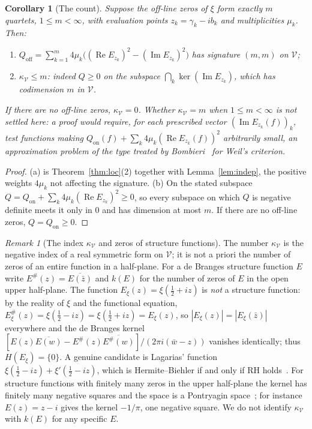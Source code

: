 \documentclass[11pt]{amsart}
\newtheorem{corollary}[theorem]{Corollary}
\theoremstyle{definition}
\theoremstyle{remark}
\newtheorem{remark}[theorem]{Remark}
\newcommand{\RH}{\mathrm{RH}}
\renewcommand{\Re}{\operatorname{Re}}
\renewcommand{\Im}{\operatorname{Im}}
\newcommand{\half}{\tfrac12}
\newcommand{\kV}{\kappa_{\mathcal V}}
\begin{document}
\begin{corollary}[The count]\label{cor:count}
Suppose the off-line zeros of $\xi$ form exactly $m$ quartets, $1\le m<\infty$, with evaluation
points $z_k=\gamma_k-ib_k$ and multiplicities $\mu_k$. Then:
\begin{enumerate}
\item[(a)] $Q_{\mathrm{off}}=\sum_{k=1}^m4\mu_k\big((\Re E_{z_k})^2-(\Im E_{z_k})^2\big)$ has
signature $(m,m)$ on $\mathcal V$;
\item[(b)] $\kV\le m$: indeed $Q\ge0$ on the subspace $\bigcap_k\ker(\Im E_{z_k})$, which has
codimension $m$ in $\mathcal V$.
\end{enumerate}
If there are no off-line zeros, $\kV=0$. Whether $\kV=m$ when $1\le m<\infty$ is not settled
here: a proof would require, for each prescribed vector $(\Im E_{z_k}(f))_k$, test functions
making $Q_{\mathrm{on}}(f)+\sum_k4\mu_k(\Re E_{z_k}(f))^2$ arbitrarily small, an approximation
problem of the type treated by Bombieri~\cite{Bombieri} for Weil's criterion.
\end{corollary}
\begin{proof}
(a) is Theorem~\ref{thm:loc}(2) together with Lemma~\ref{lem:indep}, the positive weights
$4\mu_k$ not affecting the signature. (b) On the stated subspace $Q=Q_{\mathrm{on}}+\sum_k
4\mu_k(\Re E_{z_k})^2\ge0$, so every subspace on which $Q$ is negative definite meets it only in
$0$ and has dimension at most $m$. If there are no off-line zeros, $Q=Q_{\mathrm{on}}\ge0$.
\end{proof}

\begin{remark}[The index $\kV$ and zeros of structure functions]\label{rem:deferred}
The number $\kV$ is the negative index of a real symmetric form on $\mathcal V$; it is not a priori
the number of zeros of an entire function in a half-plane. For a de Branges structure function $E$
write $E^\#(z)=\overline{E(\bar z)}$ and $k(E)$ for the number of zeros of $E$ in the open upper
half-plane. The function $E_\xi(z)=\xi(\half+iz)$ is \emph{not} a structure function: by the
reality of $\xi$ and the functional equation,
$E_\xi^\#(z)=\xi(\half-iz)=\xi(\half+iz)=E_\xi(z)$, so
$|E_\xi(z)|=|E_\xi(\bar z)|$ everywhere and the de Branges kernel
$[E(z)\overline{E(w)}-E^\#(z)\overline{E^\#(w)}]/(2\pi i(\bar w-z))$ vanishes identically; thus
$H(E_\xi)=\{0\}$. A genuine candidate is Lagarias' function $\xi(\half-iz)+\xi'(\half-iz)$, which
is Hermite--Biehler if and only if $\RH$ holds~\cite[Theorem~1]{Lagarias}. For structure functions with
finitely many zeros in the upper half-plane the kernel has finitely many negative squares and the
space is a Pontryagin space~\cite{KW}; for instance $E(z)=z-i$ gives the kernel $-1/\pi$, one
negative square. We do not identify $\kV$ with $k(E)$ for any specific $E$.
\end{remark}
\end{document}
